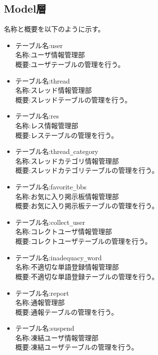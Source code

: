 \documentclass[a4j]{jarticle}
\begin{document}
 \subsection{Model層}
 名称と概要を以下のように示す。
  \begin{itemize}
    
  \item テーブル名:user\\
    名称:ユーザ情報管理部\\
    概要:ユーザテーブルの管理を行う。

  \item テーブル名:thread\\
    名称:スレッド情報管理部\\
    概要:スレッドテーブルの管理を行う。

  \item テーブル名:res\\
    名称:レス情報管理部\\
    概要:レステーブルの管理を行う。

  \item テーブル名:thread\verb|_|category\\
    名称:スレッドカテゴリ情報管理部\\
    概要:スレッドカテゴリテーブルの管理を行う。
  \item テーブル名:favorite\verb|_|bbs\\
    名称:お気に入り掲示板情報管理部\\
    概要:お気に入り掲示板テーブルの管理を行う。

   \item テーブル名:collect\verb|_|user\\
    名称:コレクトユーザ情報管理部\\
    概要:コレクトユーザテーブルの管理を行う。
    
   \item テーブル名:inadequacy\verb|_|word\\
     名称:不適切な単語登録情報管理部\\
    概要:不適切な単語登録テーブルの管理を行う。


   \item テーブル名:report\\
    名称:通報管理部\\
    概要:通報テーブルの管理を行う。



   \item テーブル名:suspend\\
    名称:凍結ユーザ情報管理部\\
    概要:凍結ユーザテーブルの管理を行う。


\end{itemize}
\end{document}
